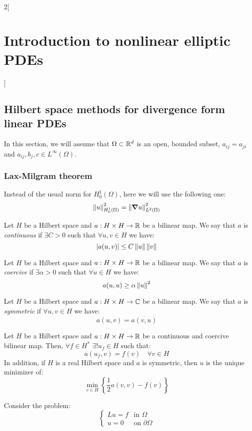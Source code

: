 \documentclass[../../../main_math.tex]{subfiles}
\begin{document}
\begin{multicols}{2}[\section{Introduction to nonlinear elliptic PDEs}]
  \subsection{Hilbert space methods for divergence form linear PDEs}
  In this section, we will assume that $\Omega\subset\RR^d$ is an open, bounded subset, $a_{ij}=a_{ji}$ and $a_{ij},b_j,c\in L^\infty(\Omega)$.
  \subsubsection{Lax-Milgram theorem}
  \begin{remark}
    Instead of the usual norm for $H_0^1(\Omega)$, here we will use the following one:
    $$
      \norm{u}_{H_0^1(\Omega)}^2=\norm{\grad u}_{L^2(\Omega)}^2
    $$
  \end{remark}
  \begin{definition}
    Let $H$ be a Hilbert space and $a:H\times H\rightarrow\RR$ be a bilinear map. We say that $a$ is \emph{continuous} if $\exists C>0$ such that $\forall u,v\in H$ we have: $$\abs{a(u,v)}\leq C\norm{u}\norm{v}$$
  \end{definition}
  \begin{definition}
    Let $H$ be a Hilbert space and $a:H\times H\rightarrow\RR$ be a bilinear map. We say that $a$ is \emph{coercive} if $\exists\alpha>0$ such that $\forall u\in H$ we have: $$a(u,u)\geq\alpha\norm{u}^2$$
  \end{definition}
  \begin{definition}
    Let $H$ be a Hilbert space and $a:H\times H\rightarrow\CC$ be a bilinear map. We say that $a$ is \emph{symmetric} if $\forall u,v\in H$ we have: $$a(u,v)=\overline{a(v,u)}$$
  \end{definition}
  \begin{theorem}\label{INEPDE:laxmilgram}
    Let $H$ be a Hilbert space and $a:H\times H\rightarrow\RR$ be a continuous and coercive bilinear map. Then, $\forall f\in H^*$ $\exists! u_f\in H$ such that: $$a(u_f,v)=f(v)\quad \forall v\in H$$
    In addition, if ${H}$ is a real Hilbert space and $a$ is symmetric, then $u$ is the unique minimizer of:
    $$\min_{v\in H}\left\{\frac{1}{2}a(v,v)-f(v)\right\}$$
  \end{theorem}
  \begin{proposition}
    Consider the problem:
    $$
      \begin{cases}
        L u=f & \text{in }\Omega         \\
        u=0   & \text{on }\partial\Omega

\end{cases}$$
\end{proposition}
\end{multicols}
\end{document}
